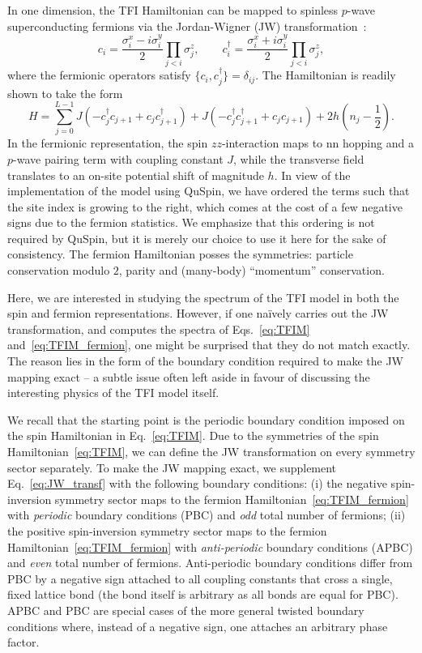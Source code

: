 \documentclass{SciPost}
\newcommand\0{\scalebox{-1}[1]{0}}
\begin{document}
In one dimension, the TFI Hamiltonian can be mapped to spinless $p$-wave superconducting fermions via the Jordan-Wigner (JW) transformation~\cite{sachdev_book,dziarmaga_10,pfeuty_79}:
\begin{equation}
c_i=\frac{\sigma^x_i-i\sigma^y_i}{2}\prod_{j<i}\sigma^z_j,\qquad c^\dagger_i=\frac{\sigma^x_i+i\sigma^y_i}{2}\prod_{j<i}\sigma^z_j,
\label{eq:JW_transf}
\end{equation} 
where the fermionic operators satisfy $\{c_i,c^\dagger_j\}=\delta_{ij}$. The Hamiltonian is readily shown to take the form
\begin{equation}
H=\sum_{j=0}^{L-1}J\left(-c^\dagger_jc_{j+1} + c_jc^\dagger_{j+1} \right) +J\left( -c^\dagger_jc^\dagger_{j+1} + c_jc_{j+1}\right) + 2h\left(n_j-\frac{1}{2}\right).
\label{eq:TFIM_fermion}
\end{equation}
In the fermionic representation, the spin $zz$-interaction maps to nn hopping and a $p$-wave pairing term with coupling constant $J$, while the transverse field translates to an on-site potential shift of magnitude $h$. In view of the implementation of the model using QuSpin, we have ordered the terms such that the site index is growing to the right, which comes at the cost of a few negative signs due to the fermion statistics. We emphasize that this ordering is not required by QuSpin, but it is merely our choice to use it here for the sake of consistency. The fermion Hamiltonian posses the symmetries: particle conservation modulo $2$, parity and (many-body) ``momentum'' conservation.

Here, we are interested in studying the spectrum of the TFI model in both the spin and fermion representations. However, if one na\"ively carries out the JW transformation, and computes the spectra of Eqs.~\eqref{eq:TFIM} and~\eqref{eq:TFIM_fermion}, one might be surprised that they do not match exactly. The reason lies in the form of the boundary condition required to make the JW mapping exact -- a subtle issue often left aside in favour of discussing the interesting physics of the TFI model itself. 

We recall that the starting point is the periodic boundary condition imposed on the spin Hamiltonian in Eq.~\eqref{eq:TFIM}. Due to the symmetries of the spin Hamiltonian~\eqref{eq:TFIM}, we can define the JW transformation on every symmetry sector separately. To make the JW mapping exact, we supplement Eq.~\eqref{eq:JW_transf} with the following boundary conditions: (i) the negative spin-inversion symmetry sector maps to the fermion Hamiltonian~\eqref{eq:TFIM_fermion} with \emph{periodic} boundary conditions (PBC) and \emph{odd} total number of fermions; (ii) the positive spin-inversion symmetry sector maps to the fermion Hamiltonian~\eqref{eq:TFIM_fermion} with \emph{anti-periodic} boundary conditions (APBC) and \emph{even} total number of fermions. Anti-periodic boundary conditions differ from PBC by a negative sign attached to all coupling constants that cross a single, fixed lattice bond (the bond itself is arbitrary as all bonds are equal for PBC). APBC and PBC are special cases of the more general twisted boundary conditions where, instead of a negative sign, one attaches an arbitrary phase factor.
\end{document}
